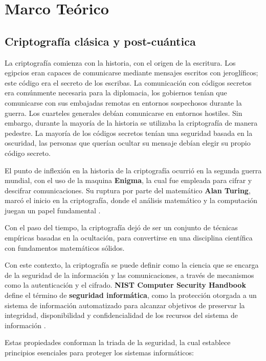 \section{Marco Teórico}

    \subsection{Criptografía clásica y post-cuántica}
        La criptografía comienza con la historia, con el origen de la escritura. Los egipcios eran capaces de comunicarse mediante mensajes escritos con jeroglíficos; este código era el secreto de los escribas. La comunicación con códigos secretos era comúnmente necesaria para la diplomacia, los gobiernos tenían que comunicarse con sus embajadas remotas en entornos sospechosos durante la guerra. Los cuarteles generales debían comunicarse en entornos hostiles. Sin embargo, durante la mayoría de la historia se utilizaba la criptografía de manera pedestre. La mayoría de los códigos secretos tenían una seguridad basada en la oscuridad, las personas que querían ocultar su mensaje debían elegir su propio código secreto. 

        El punto de inflexión en la historia de la criptografía ocurrió en la segunda guerra mundial, con el uso de la maquina \textbf{Enigma}, la cual fue empleada para cifrar y descifrar comunicaciones. Su ruptura por parte del matemático  \textbf{Alan Turing}, marcó el inicio en la criptografía, donde el análisis matemático y la computación juegan un papel fundamental \cite{vaudenay_classical_2006}.

        Con el paso del tiempo, la criptografía dejó de ser un conjunto de técnicas empíricas basadas en la ocultación, para convertirse en una disciplina científica con fundamentos matemáticos sólidos.
    
        Con este contexto, la criptografía se puede definir como la ciencia que se encarga de la seguridad de la información y las comunicaciones, a través de mecanismos como la autenticación y el cifrado. \textbf{NIST Computer Security Handbook} define el término de  \textbf{seguridad informática}, como la protección otorgada a un sistema de información automatizado para alcanzar objetivos de preservar la integridad, disponibilidad y confidencialidad de los recursos del sistema de información \cite{nieles_introduction_2017}. 

        Estas propiedades conforman la triada de la seguridad, la cual establece principios esenciales para proteger los sistemas informáticos:
        
